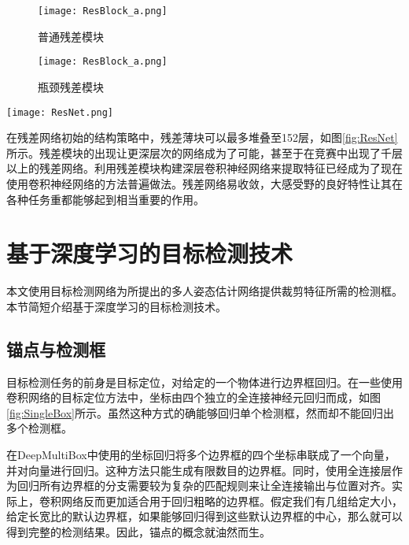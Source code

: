 \begin{figure*}[htbp]	
	\centering
	\begin{subfigure}[b]{0.35\textwidth}
		\texttt{[image: ResBlock\_a.png]}
		\caption{普通残差模块}
	\end{subfigure}
	\hskip1.5cm
	\begin{subfigure}[b]{0.35\textwidth}
		\texttt{[image: ResBlock\_a.png]}
		\caption{瓶颈残差模块}
	\end{subfigure}
	\caption{残差模块结构\cite{He2015Deep}}
	\label{fig:Resblock}
\end{figure*}
\begin{figure*}[htbp]	
	\centering
	\texttt{[image: ResNet.png]}
	\caption{残差网络结构\cite{He2015Deep}}
	\label{fig:ResNet}
\end{figure*}

在残差网络初始的结构策略中，残差薄块可以最多堆叠至152层，如图\ref{fig:ResNet}所示。残差模块的出现让更深层次的网络成为了可能，甚至于在竞赛中出现了千层以上的残差网络。利用残差模块构建深层卷积神经网络来提取特征已经成为了现在使用卷积神经网络的方法普遍做法。残差网络易收敛，大感受野的良好特性让其在各种任务重都能够起到相当重要的作用。

\section{基于深度学习的目标检测技术}
\label{sec:factsobjectdetection}
本文使用目标检测网络为所提出的多人姿态估计网络提供裁剪特征所需的检测框。本节简短介绍基于深度学习的目标检测技术。

\subsection{锚点与检测框}
\label{subsec:factsanchors}
目标检测任务的前身是目标定位，对给定的一个物体进行边界框回归\cite{ILSVRC15}。在一些使用卷积网络的目标定位方法中，坐标由四个独立的全连接神经元回归而成，如图\ref{fig:SingleBox}所示。虽然这种方式的确能够回归单个检测框，然而却不能回归出多个检测框。

在DeepMultiBox中使用的坐标回归\cite{erhan2014scalable}将多个边界框的四个坐标串联成了一个向量，并对向量进行回归。这种方法只能生成有限数目的边界框。同时，使用全连接层作为回归所有边界框的分支需要较为复杂的匹配规则来让全连接输出与位置对齐。实际上，卷积网络反而更加适合用于回归粗略的边界框。假定我们有几组给定大小，给定长宽比的默认边界框，如果能够回归得到这些默认边界框的中心，那么就可以得到完整的检测结果。因此，锚点的概念就油然而生。


